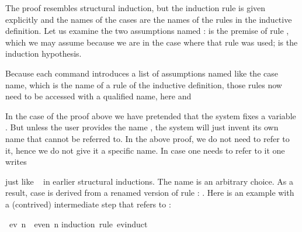 \begin{isabellebody}
\begin{isamarkuptext}
The proof resembles structural induction, but the induction rule is given
explicitly and the names of the cases are the names of the rules in the
inductive definition.
Let us examine the two assumptions named :
 is the premise of rule , which we may assume
because we are in the case where that rule was used; 
is the induction hypothesis.
\begin{warn}
Because each  command introduces a list of assumptions
named like the case name, which is the name of a rule of the inductive
definition, those rules now need to be accessed with a qualified name, here
 and 
\end{warn}

In the case  of the proof above we have pretended that the
system fixes a variable .  But unless the user provides the name
, the system will just invent its own name that cannot be referred
to.  In the above proof, we do not need to refer to it, hence we do not give
it a specific name. In case one needs to refer to it one writes
\begin{quote}
 
\end{quote}
just like ~ in earlier structural inductions.
The name  is an arbitrary choice. As a result,
case  is derived from a renamed version of
rule : .
Here is an example with a (contrived) intermediate step that refers to :%
\end{isamarkuptext}%
\isamarkuptrue%
\isamarkupfalse%
\ {}ev\ n\ {}\ even\ n{}\isanewline
%
\isadelimproof
%
\endisadelimproof
%
\isatagproof
{}\isamarkupfalse%
{}induction\ rule{}\ ev{}induct{}\isanewline
\ \ \isamarkupfalse%

\end{isabellebody}
